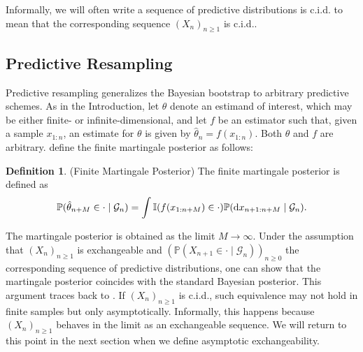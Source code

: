 \documentclass{article}
\theoremstyle{definition}
\newtheorem{definition}{Definition}
\newcommand{\di}{{\rm d}}
\renewcommand{\&}{and}
\begin{document}
Informally, we will often write a sequence of predictive distributions is c.i.d. to mean that the corresponding sequence $(X_{n})_{n\geq 1}$ is c.i.d..

\subsection{Predictive Resampling}\label{sec:pred_resampl}

Predictive resampling generalizes the Bayesian bootstrap \citep{rubin1981bayesian} to arbitrary predictive schemes. As in the Introduction, let $\theta$ denote an estimand of interest, which may be either finite- or infinite-dimensional, and let $f$ be an estimator such that, given a sample $x_{1:n}$, an estimate for $\theta$ is given by $\hat{\theta}_n = f(x_{1:n})$. Both $\theta$ and $f$ are arbitrary. \cite{fong2021martingale} define the finite martingale posterior as follows:

\begin{definition} (Finite Martingale Posterior)
The finite martingale posterior is defined as
\begin{equation}\label{eq:martingale_posterior} \mathbb{P}(\hat{\theta}_{n+M} \in \cdot \mid \mathcal{G}_n) = \int \mathbb{I}(f(x_{1:n+M}) \in \cdot ) \mathbb{P} (\di x_{n+1:n+M} \mid \mathcal{G}_n). \end{equation} \end{definition}

The martingale posterior is obtained as the limit $M\to \infty$. Under the assumption that $(X_{n})_{n \geq 1}$ is exchangeable and $(\mathbb{P}(X_{n+1} \in \cdot \mid \mathcal{G}_{n}))_{n \geq 0}$ the corresponding sequence of predictive distributions, one can show that the martingale posterior coincides with the standard Bayesian posterior. This argument traces back to \cite{doob1949application}. If $(X_{n})_{n \geq 1}$ is c.i.d., such equivalence may not hold in finite samples but only asymptotically. Informally, this happens because $(X_{n})_{n \geq 1}$ behaves in the limit as an exchangeable sequence. We will  return to this point in the next section when we define asymptotic exchangeability.
\end{document}
